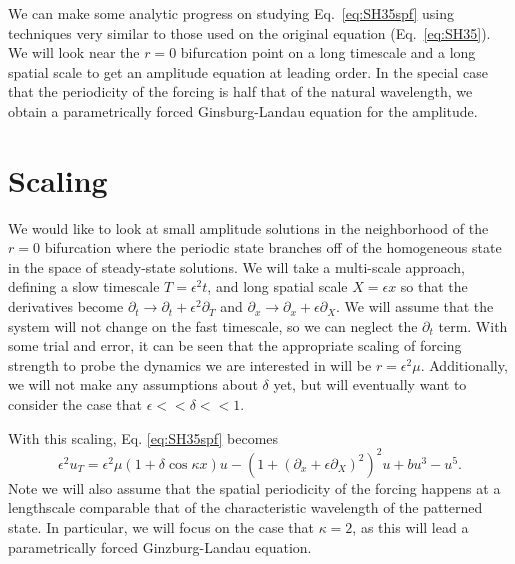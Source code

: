 \documentclass[api,pof,pre,12pt,a4paper]{revtex4-1}
\begin{document}
We can make some analytic progress on studying Eq.~\ref{eq:SH35spf} using techniques very similar to those used on the original equation (Eq.~\ref{eq:SH35}). We will look near the $r=0$ bifurcation point on a long timescale and a long spatial scale to get an amplitude equation at leading order.  In the special case that the periodicity of the forcing is half that of the natural wavelength, we obtain a parametrically forced Ginsburg-Landau equation for the amplitude.  

\section{Scaling}
We would like to look at small amplitude solutions in the neighborhood of the $r=0$ bifurcation where the periodic state branches off of the homogeneous state in the space of steady-state solutions.  We will take a multi-scale approach, defining a slow timescale $T=\epsilon^2t$, and long spatial scale $X=\epsilon x$ so that the derivatives become $\partial_t \rightarrow \partial_t+\epsilon^2\partial_T$ and $\partial_x \rightarrow \partial_x+\epsilon\partial_X$.  We will assume that the system will not change on the fast timescale, so we can neglect the $\partial_t$ term. With some trial and error, it can be seen that the appropriate scaling of forcing strength to probe the dynamics we are interested in will be $r=\epsilon^2 \mu$.     Additionally, we will not make any assumptions about $\delta$ yet, but will eventually want to consider the case that $\epsilon <<\delta <<1$.

With this scaling, Eq. \ref{eq:SH35spf} becomes 
\begin{equation}
\epsilon^2 u_T = \epsilon^2 \mu(1+\delta \cos{\kappa x}) u -\left(1+(\partial_{x}+\epsilon \partial_X)^2\right)^2u+bu^3-u^5
\label{eq:SH35spfeps}.
\end{equation}
Note we will also assume that the spatial periodicity of the forcing happens at a lengthscale comparable that of the characteristic wavelength of the patterned state.  In particular, we will focus on the case that $\kappa=2$, as this will lead a parametrically forced Ginzburg-Landau equation.
\end{document}
